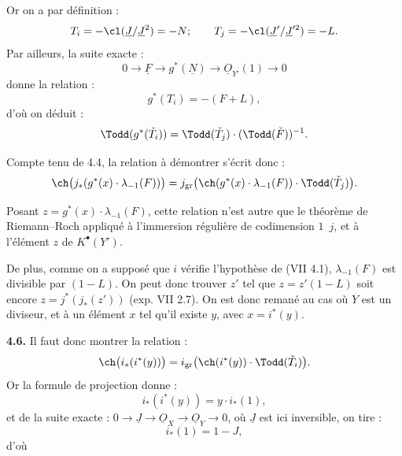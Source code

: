 
Or on a par
définition :
\[
 T_i=-\cl(\underline{J}/\underline{J}^2)=-N;\qquad
 T_j=-\cl(\underline{J}'/\underline{J}'^2)=-L.
\]
Par ailleurs, la suite exacte :
\[
0\longrightarrow \underline{F}\longrightarrow g^*(\underline{N})\longrightarrow \underline{O}_{Y'}(1)\longrightarrow0
\]
donne la relation :
\[
 g^*(T_i)=-(F+L),
\]
d'où on déduit :
\[
 \Todd(g^*(\check T_i))=\Todd(\check T_j)\cdot(\Todd(\check F))^{-1}.
\]

Compte tenu de 4.4, la relation à démontrer s'écrit donc :
\[
 \ch\bigl(j_*(g^*(x)\cdot\lambda_{-1}(F))\bigr)
 =
 j_{\mathrm{gr}}\bigl(\ch(g^*(x)\cdot\lambda_{-1}(F))\cdot\Todd(\check T_j)\bigr).
\]

Posant \(z=g^*(x)\cdot\lambda_{-1}(F)\), cette relation n'est autre que le théorème de Riemann--Roch appliqué à l'immersion régulière de codimension \(1\)~\(j\), et à l'élément \(z\) de \(K^{\bullet}(Y')\).

De plus, comme on a supposé que \(i\) vérifie l'hypothèse de (VII 4.1), \(\lambda_{-1}(F)\) est divisible par \((1-L)\). On peut donc trouver \(z'\) tel que \(z=z'(1-L)\) soit encore \(z=j^*(j_*(z'))\) (exp. VII 2.7). On est donc remané au cas où \(Y\) est un diviseur, et à un élément \(x\) tel qu'il existe \(y\), avec \(x=i^*(y)\).

\textbf{4.6.} Il faut donc montrer la relation :
\[
 \ch\bigl(i_*(i^*(y))\bigr)
 =
 i_{\mathrm{gr}}\bigl(\ch(i^*(y))\cdot\Todd(\check T_i)\bigr).
\]
Or la formule de projection donne :
\[
 i_*(i^*(y))=y\cdot i_*(1),
\]
et de la suite exacte : \(0\longrightarrow \underline{J}\longrightarrow\underline{O}_X\longrightarrow\underline{O}_Y\longrightarrow0\), où \(\underline{J}\) est ici inversible, on tire :
\[
 i_*(1)=1-J,
\]
d'où
